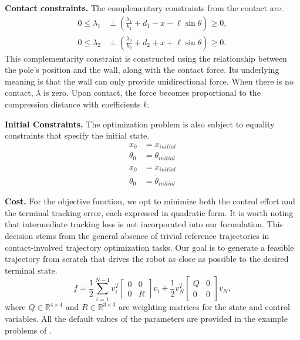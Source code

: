 \textbf{Contact constraints.}
The complementary constraints from the contact are:
\begin{align}
 0 \leq \lambda_1 &\perp \left(\frac{\lambda_1}{k_1} + d_1 - x - \ell \sin \theta\right)\geq 0, \\
 0 \leq \lambda_2 &\perp \left(\frac{\lambda_2}{k_2} + d_2 + x + \ell \sin \theta\right)\geq 0.
\end{align}
This complementarity constraint is constructed using the relationship between the pole's position and the wall, along with the contact force. Its underlying meaning is that the wall can only provide unidirectional force. When there is no contact, $\lambda$ is zero. Upon contact, the force becomes proportional to the compression distance with coefficients $k$.

\textbf{Initial Constraints.}
The optimization problem is also subject to equality constraints that specify the initial state. 
\begin{align}
    x_0 &= x_{initial}\\
    \theta_0 &= \theta_{initial}\\
    \dot{x}_0 &= \dot{x}_{initial}\\
    \dot{\theta}_0 &= \dot{\theta}_{initial}
\end{align}

\textbf{Cost. }
For the objective function, we opt to minimize both the control effort and the terminal tracking error, each expressed in quadratic form. It is worth noting that intermediate tracking loss is not incorporated into our formulation. This decision stems from the general absence of trivial reference trajectories in contact-involved trajectory optimization tasks. Our goal is to generate a feasible trajectory from scratch that drives the robot as close as possible to the desired terminal state.
\begin{equation}
    f = \frac{1}{2} \sum_{i=1}^{N-1} v_i^T \begin{bmatrix} 0 & 0 \\ 0 & R \end{bmatrix} v_i + \frac{1}{2} v_N^T \begin{bmatrix} Q & 0 \\ 0 & 0 \end{bmatrix} v_N,
\end{equation}
where $Q\in\mathbb{R}^{4\times4}$ and $R\in\mathbb{R}^{3\times3}$ are weighting matrices for the state and control variables. All the default values of the parameters are provided in the example problems of \crisp. 

